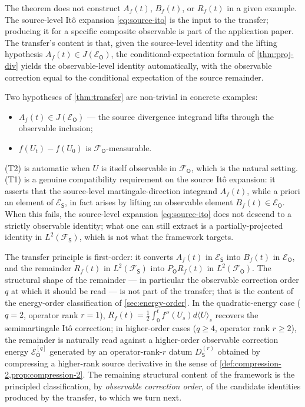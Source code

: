 \documentclass[11pt,reqno]{amsart}
\theoremstyle{plain}
\theoremstyle{definition}
\theoremstyle{remark}
\newcommand{\Energy}{\mathcal{E}}
\newcommand{\Source}{\mathsf{S}}
\newcommand{\Obs}{\mathsf{O}}
\begin{document}
The theorem does not construct $A_f(t)$, $B_f(t)$, or $R_f(t)$ in a
given example. The source-level It\^o expansion \eqref{eq:source-ito}
is the input to the transfer; producing it for a specific composite
observable is part of the application paper. The transfer's content is
that, given the source-level identity and the lifting hypothesis
$A_f(t)\in J(\Energy_\Obs)$, the conditional-expectation formula of
\cref{thm:proj-div} yields the observable-level identity automatically,
with the observable correction equal to the conditional expectation of
the source remainder.

Two hypotheses of \cref{thm:transfer} are non-trivial in concrete
examples:
\begin{itemize}
\item[(T1)] $A_f(t)\in J(\Energy_\Obs)$ --- the source divergence
  integrand lifts through the observable inclusion;
\item[(T2)] $f(U_t)-f(U_0)$ is $\mathcal F_\Obs$-measurable.
\end{itemize}
(T2) is automatic when $U$ is itself observable in $\mathcal F_\Obs$,
which is the natural setting. (T1) is a genuine compatibility
requirement on the source It\^o expansion: it asserts that the
source-level martingale-direction integrand $A_f(t)$, while a priori
an element of $\Energy_\Source$, in fact arises by lifting an
observable element $B_f(t)\in\Energy_\Obs$. When this fails, the
source-level expansion \eqref{eq:source-ito} does not descend to a
strictly observable identity; what one can still extract is a
partially-projected identity in $L^{2}(\mathcal F_\Source)$, which is
not what the framework targets.

The transfer principle is first-order: it converts $A_f(t)$ in
$\Energy_\Source$ into $B_f(t)$ in $\Energy_\Obs$, and the
remainder $R_f(t)$ in $L^{2}(\mathcal F_\Source)$ into
$P_\Obs R_f(t)$ in $L^{2}(\mathcal F_\Obs)$. The structural shape of
the remainder --- in particular the observable correction order $q$
at which it should be read --- is not part of the transfer; that is
the content of the energy-order classification of
\cref{sec:energy-order}. In the quadratic-energy case
($q=2$, operator rank $r=1$),
$R_f(t)=\tfrac12\int_0^t f''(U_s)d\langle U\rangle_s$ recovers the
semimartingale It\^o correction; in higher-order cases ($q\ge 4$,
operator rank $r\ge 2$), the remainder is naturally read against a
higher-order observable correction energy $\Energy_\Obs^{[q]}$
generated by an operator-rank-$r$ datum $D_\Source^{(r)}$ obtained by
compressing a higher-rank source derivative in the sense of
\cref{def:compression-2,prop:compression-2}. The remaining structural
content of the framework is the principled classification, by
\emph{observable correction order}, of the candidate identities
produced by the
transfer, to which we turn next.
\end{document}

